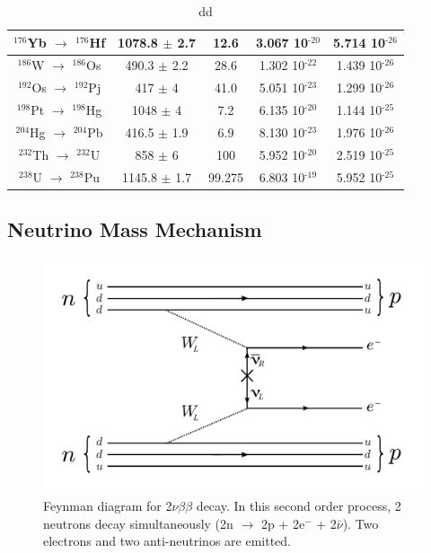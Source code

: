 \documentclass[main.tex]{subfiles}
\begin{document}
\begin{table}
\begin{tabular}{|c|c|c|c|c|}
\hline
$^{\text{176}}$Yb $\rightarrow$ $^{\text{176}}$Hf & 1078.8 $\pm$ 2.7 & 12.6   & 3.067 10$^{\text{-20}}$ & 5.714 10$^{\text{-26}}$\\ 
\hline
$^{\text{186}}$W $\rightarrow$ $^{\text{186}}$Os & 490.3   $\pm$ 2.2 & 28.6   & 1.302 10$^{\text{-22}}$ & 1.439 10$^{\text{-26}}$\\ 
\hline
$^{\text{192}}$Os $\rightarrow$ $^{\text{192}}$Pj & 417    $\pm$ 4   & 41.0   & 5.051 10$^{\text{-23}}$ & 1.299 10$^{\text{-26}}$\\ 
\hline 
$^{\text{198}}$Pt $\rightarrow$ $^{\text{198}}$Hg & 1048   $\pm$ 4   & 7.2    & 6.135 10$^{\text{-20}}$ & 1.144 10$^{\text{-25}}$\\
\hline 
$^{\text{204}}$Hg $\rightarrow$ $^{\text{204}}$Pb & 416.5  $\pm$ 1.9 & 6.9    & 8.130 10$^{\text{-23}}$ & 1.976 10$^{\text{-26}}$\\
\hline 
$^{\text{232}}$Th $\rightarrow$ $^{\text{232}}$U & 858     $\pm$ 6   & 100    & 5.952 10$^{\text{-20}}$ & 2.519 10$^{\text{-25}}$\\
\hline 
$^{\text{238}}$U $\rightarrow$ $^{\text{238}}$Pu & 1145.8  $\pm$ 1.7 & 99.275 & 6.803 10$^{\text{-19}}$ & 5.952 10$^{\text{-25}}$\\ 
\hline
\end{tabular}
\caption{dd}
\end{table}


\FloatBarrier


\subsection{Neutrino Mass Mechanism}


\begin{figure}[h!]
\begin{center}
\includegraphics[scale=0.5]{pictures/Chap2/0nubbFeynmanDiagram_NMM.pdf}
\caption{Feynman diagram for 2$\nu\beta\beta$ decay. In this second order process, 2 neutrons decay simultaneously (2n $\rightarrow$ 2p + 2e$^-$ + 2$\bar{\nu}$). Two electrons and two anti-neutrinos are emitted.}
\label{0nubbNMM}
\end{center}
\end{figure}
\end{document}
